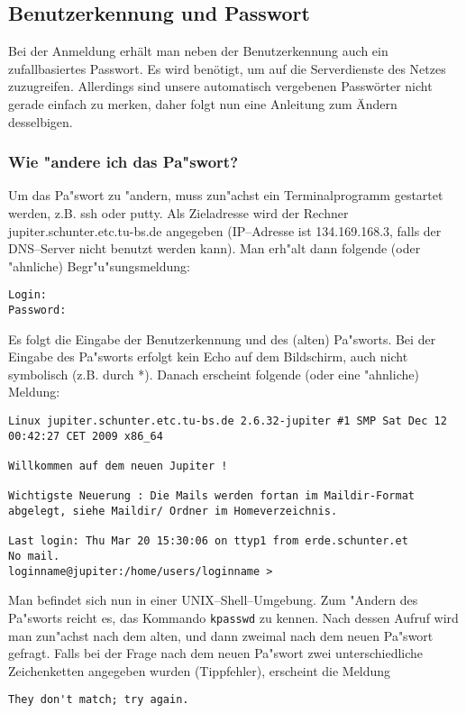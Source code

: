 \subsection{Benutzerkennung und Passwort}
Bei der Anmeldung erhält man neben der Benutzerkennung auch ein
zufallbasiertes Passwort. Es wird benötigt, um auf die Serverdienste
des Netzes zuzugreifen. Allerdings sind unsere automatisch vergebenen
Passwörter nicht gerade einfach zu merken, daher folgt nun eine
Anleitung zum Ändern desselbigen. 
\subsubsection*{Wie "andere ich das Pa"swort?}

Um das Pa"swort zu "andern, muss zun"achst ein Terminalprogramm gestartet werden,
z.B. \glossar ssh oder \glossar putty. Als Zieladresse wird der Rechner jupiter.schunter.etc.tu-bs.de angegeben
(IP--Adresse ist 134.169.168.3, falls der \glossar DNS--Server nicht benutzt
werden kann). Man erh"alt dann folgende (oder "ahnliche) Begr"u"sungsmeldung: 

\begin{verbatim}
Login:
Password: 
\end{verbatim}
Es folgt die Eingabe der Benutzerkennung und des (alten) Pa"sworts. Bei der
Eingabe des Pa"sworts erfolgt kein Echo auf dem Bildschirm, auch nicht
symbolisch (z.B. durch *). Danach erscheint folgende (oder eine "ahnliche)
Meldung:
\begin{verbatim}
Linux jupiter.schunter.etc.tu-bs.de 2.6.32-jupiter #1 SMP Sat Dec 12 00:42:27 CET 2009 x86_64

Willkommen auf dem neuen Jupiter !

Wichtigste Neuerung : Die Mails werden fortan im Maildir-Format
abgelegt, siehe Maildir/ Ordner im Homeverzeichnis.

Last login: Thu Mar 20 15:30:06 on ttyp1 from erde.schunter.et
No mail.
loginname@jupiter:/home/users/loginname >
\end{verbatim}

Man befindet sich nun in einer \glossar UNIX--Shell--Umgebung. Zum "Andern des
Pa"sworts reicht es, das Kommando \verb#kpasswd# zu kennen. Nach dessen Aufruf
wird man zun"achst nach dem alten, und dann zweimal nach dem neuen Pa"swort
gefragt. Falls bei der Frage nach dem neuen Pa"swort zwei unterschiedliche
Zeichenketten angegeben wurden (Tippfehler), erscheint die Meldung

\verb#They don't match; try again.#

